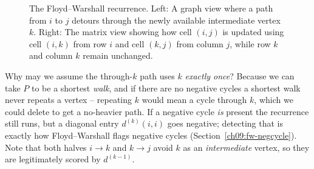 \begin{figure}[htbp]
\caption{The Floyd--Warshall recurrence. Left: A graph view where a path from $i$ to $j$ detours through the newly available intermediate vertex $k$. Right: The matrix view showing how cell $(i,j)$ is updated using cell $(i,k)$ from row $i$ and cell $(k,j)$ from column $j$, while row $k$ and column $k$ remain unchanged.}
\label{fig:fw-recurrence}
\end{figure}

\begin{trapbox}
Why may we assume the through-$k$ path uses $k$ \emph{exactly once}? Because we can take $P$ to be a
shortest \emph{walk}, and if there are no negative cycles a shortest walk never repeats a vertex --
repeating $k$ would mean a cycle through $k$, which we could delete to get a no-heavier path. If a
negative cycle \emph{is} present the recurrence still runs, but a diagonal entry $d^{(k)}(i,i)$ goes
negative; detecting that is exactly how Floyd--Warshall flags negative cycles
(Section~\ref{ch09:fw-negcycle}). Note that both halves $i\to k$ and $k\to j$ avoid
$k$ as an \emph{intermediate} vertex, so they are legitimately scored by $d^{(k-1)}$.
\end{trapbox}

